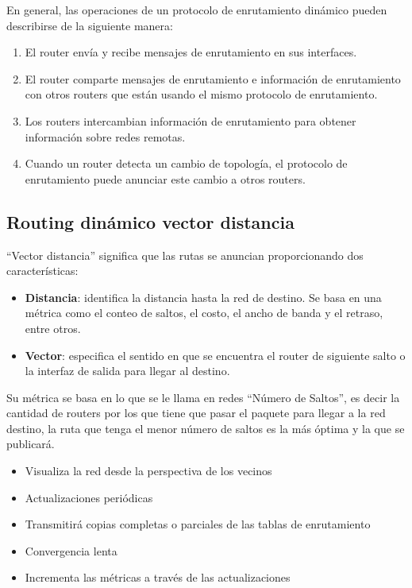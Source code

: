 \documentclass[
	12pt, %
	fleqn, %
	a4paper, %
	oneside, %
]{LegrandOrangeBook}
\begin{document}
En general, las operaciones de un protocolo de enrutamiento dinámico pueden
describirse de la siguiente manera:
\begin{enumerate}
\item El router envía y recibe mensajes de enrutamiento en sus interfaces.
\item El router comparte mensajes de enrutamiento e información de enrutamiento con otros routers que están usando el mismo protocolo de enrutamiento.
\item Los routers intercambian información de enrutamiento para obtener información sobre redes remotas.
\item Cuando un router detecta un cambio de topología, el protocolo de enrutamiento puede anunciar este cambio a otros routers.
\end{enumerate}
\subsection{Routing dinámico vector distancia}
“Vector distancia” significa que las rutas se anuncian proporcionando dos
características:
\begin{itemize}
\item \textbf{Distancia}: identifica la distancia hasta la red de destino. Se basa en una métrica como el conteo de saltos, el costo, el ancho de banda y el retraso, entre otros.
\item \textbf{Vector}: especifica el sentido en que se encuentra el router de siguiente salto o la interfaz de salida para llegar al destino.
\end{itemize}
Su métrica se basa en lo que se le llama en redes “Número de Saltos”, es decir la cantidad de routers por los que tiene que pasar el paquete para llegar a la red destino, la ruta que tenga el menor número de saltos es la más óptima y la que se publicará.
\begin{itemize}
\item Visualiza la red desde la perspectiva de los vecinos
\item Actualizaciones periódicas
\item Transmitirá copias completas o parciales de las tablas de enrutamiento
\item Convergencia lenta
\item Incrementa las métricas a través de las actualizaciones
\end{itemize}
\end{document}

